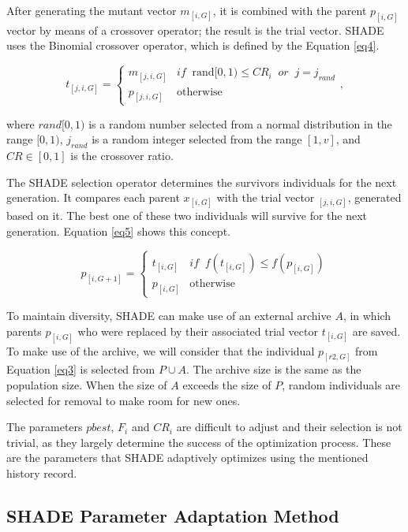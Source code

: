 \documentclass[review]{elsarticle}
\begin{document}
After generating the mutant vector $m_{[i,G]}$, it is combined with the parent $p_{[i,G]}$ vector by means of a crossover operator; the result is the trial vector. SHADE uses the Binomial crossover operator, which is defined by the Equation \eqref{eq4}.

\begin{equation}
t_{[j,i,G]} = \left\{ \begin{array}{lc}
m_{[j,i,G]} &   if \;\; \text{rand}[0,1) \le CR_i \;\; or \;\;j = j_{rand} \\
p_{[j,i,G]} &  \text{otherwise}
\end{array}
\right.,
\label{eq4}
\end{equation}

\noindent where $rand[0,1)$ is a random number selected from a normal distribution in the range $[0,1)$, $j_{rand}$ is a random integer selected from the range $[1,v]$, and $CR \in [0,1]$ is the crossover ratio.

The SHADE selection operator determines the survivors individuals for the next generation. It compares each parent $x_{[i,G]}$ with the trial vector $_{[j,i,G]}$, generated based on it. The best one of these two individuals will survive for the next generation. Equation \eqref{eq5} shows this concept.

\begin{equation}
p_{[i,G + 1]} = \left\{ \begin{array}{lc}
t_{[i,G]} &   if \;\; f(t_{[i,G]}) \le f(p_{[i,G]}) \\
p_{[i,G]} &  \text{otherwise}
\end{array}
\right.
\label{eq5}
\end{equation}

To maintain diversity, SHADE can make use of an external archive $A$, in which parents $p_{[i,G]}$ who were replaced by their associated trial vector $t_{[i,G]}$ are saved. To make use of the archive, we will consider that the individual $p_{[r2,G]}$ from Equation \eqref{eq3} is selected from $P \cup A$. The archive size is the same as the population size. When the size of $A$ exceeds the size of $P$, random individuals are selected for removal to make room for new ones.

The parameters $pbest$, $F_i$ and $CR_i$ are difficult to adjust and their selection is not trivial, as they largely determine the success of the optimization process. These are the parameters that SHADE adaptively optimizes using the mentioned history record.

\subsection{SHADE Parameter Adaptation Method}
\end{document}
